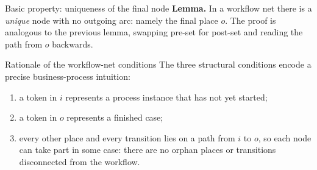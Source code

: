 \begin{notebox}{Basic property: uniqueness of the final node}
\textbf{Lemma.} In a workflow net there is a \emph{unique} node with no outgoing arc: namely the final place $o$. The proof is analogous to the previous lemma, swapping pre-set for post-set and reading the path from $o$ backwards.
\end{notebox}

\begin{notebox}{Rationale of the workflow-net conditions}
The three structural conditions encode a precise business-process intuition:
\begin{enumerate}
  \item a token in $i$ represents a process instance that has not yet started;
  \item a token in $o$ represents a finished case;
  \item every other place and every transition lies on a path from $i$ to $o$, so each node can take part in some case: there are no orphan places or transitions disconnected from the workflow.
\end{enumerate}
\end{notebox}

